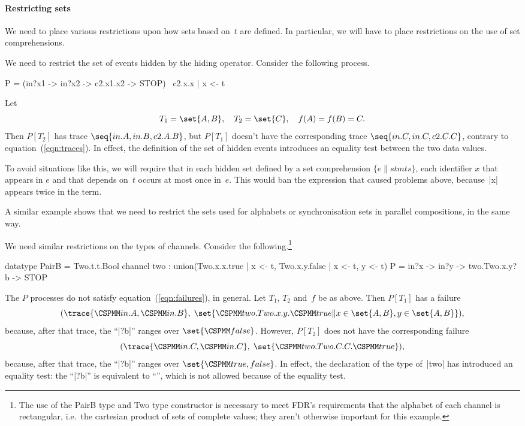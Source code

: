 
\paragraph{Restricting sets}

We need to place various restrictions upon how sets based on~$t$ are defined.
In particular, we will have to place restrictions on the use of set
comprehensions. 

We need to restrict the set of events hidden by the hiding operator.  Consider
the following process.
\begin{cspm}
P = (in?x1 -> in?x2 -> c2.x1.x2 -> STOP) \ {c2.x.x | x <- t}
\end{cspm}
Let
\[
T_1 = \set{A,B}, \quad T_2 = \set{C}, \quad f(A) = f(B) =  C.
\]
Then $P[T_2]$ has trace $\seq{in.A, in.B, c2.A.B}$, but $P[T_1]$ doesn't have
the corresponding trace $\seq{in.C, in.C, c2.C.C}$, contrary to
equation~(\ref{eqn:traces}).  In effect, the definition of the set of hidden
events introduces an equality test between the two data values.

To avoid situations like this, we will require that in each hidden set defined
by a set comprehension $\{ e \| stmts\}$, each identifier $x$ that appears in
$e$ and that depends on~$t$ occurs at most once in~$e$.  This would ban the
expression  that caused problems above, because~|x|
appears twice in the term.

A similar example shows that we need to restrict the sets used for
alphabets or synchronisation sets in parallel compositions, in the same way.

We need similar restrictions on the types of channels.  Consider the
following.\footnote{The use of the {\cspmfont PairB} type and {\cspmfont Two}
type constructor is necessary to meet FDR's requirements that the alphabet of
each channel is rectangular, i.e.~the cartesian product of sets of complete
values; they aren't otherwise important for this example.}
\begin{cspm}
datatype PairB = Two.t.t.Bool
channel two : union({Two.x.x.true | x <- t}, {Two.x.y.false | x <- t, y <- t})
P = in?x -> in?y -> two.Two.x.y?b -> STOP
\end{cspm}
%
The $P$ processes do not satisfy equation~(\ref{eqn:failures}), in general.
Let $T_1$, $T_2$ and~$f$ be as above.  Then $P[T_1]$ has a failure
\[
(\trace{\M{in}.A, \M{in}.B},\; 
  \set{\M{two.Two}.x.y.\M{true} \| x \in \set{A,B}, y \in \set{A,B}}),
\]
because, after that trace, the ``|?b|'' ranges over $\set{\M{false}}$.  
However,  $P[T_2]$ does not have the corresponding failure
\[
(\trace{\M{in}.C, \M{in}.C},\; \set{\M{two.Two}.C.C.\M{true}}),
\]
because, after that trace, the ``|?b|'' ranges over $\set{\M{true,false}}$.
In effect, the declaration of the type of~|two| has introduced an equality
test: the ``|?b|'' is equivalent to 
``'', which is not
allowed because of the equality test.  

